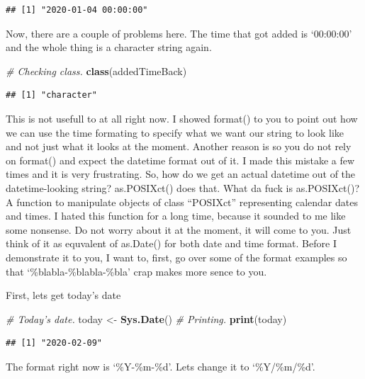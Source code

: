 \documentclass[]{book}
\newenvironment{Shaded}{\begin{snugshade}}{\end{snugshade}}
\newcommand{\CommentTok}[1]{\textcolor[rgb]{0.56,0.35,0.01}{\textit{#1}}}
\newcommand{\KeywordTok}[1]{\textcolor[rgb]{0.13,0.29,0.53}{\textbf{#1}}}
\newcommand{\NormalTok}[1]{#1}
\newcommand{\StringTok}[1]{\textcolor[rgb]{0.31,0.60,0.02}{#1}}
\begin{document}
\begin{verbatim}
## [1] "2020-01-04 00:00:00"
\end{verbatim}

Now, there are a couple of problems here. The time that got added is `00:00:00' and the whole thing is a character string again.

\begin{Shaded}
\begin{Highlighting}[]
\CommentTok{# Checking class.}
\KeywordTok{class}\NormalTok{(addedTimeBack)}
\end{Highlighting}
\end{Shaded}

\begin{verbatim}
## [1] "character"
\end{verbatim}

This is not usefull to at all right now. I showed format() to you to point out how we can use the time formating to specify what we want our string to look like and not just what it looks at the moment. Another reason is so you do not rely on format() and expect the datetime format out of it. I made this mistake a few times and it is very frustrating. So, how do we get an actual datetime out of the datetime-looking string? as.POSIXct() does that. What da fuck is as.POSIXct()? A function to manipulate objects of class ``POSIXct'' representing calendar dates and times. I hated this function for a long time, because it sounded to me like some nonsense. Do not worry about it at the moment, it will come to you. Just think of it as equvalent of as.Date() for both date and time format. Before I demonstrate it to you, I want to, first, go over some of the format examples so that `\%blabla-\%blabla-\%bla' crap makes more sence to you.

First, lets get today's date

\begin{Shaded}
\begin{Highlighting}[]
\CommentTok{# Today's date.}
\NormalTok{today <-}\StringTok{ }\KeywordTok{Sys.Date}\NormalTok{()}
\CommentTok{# Printing.}
\KeywordTok{print}\NormalTok{(today)}
\end{Highlighting}
\end{Shaded}

\begin{verbatim}
## [1] "2020-02-09"
\end{verbatim}

The format right now is `\%Y-\%m-\%d'. Lets change it to `\%Y/\%m/\%d'.
\end{document}
